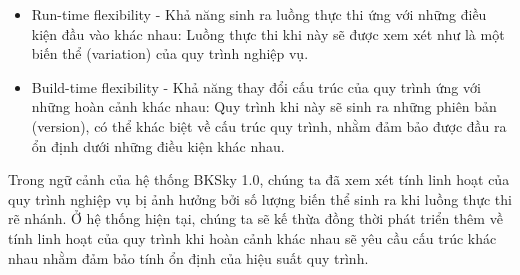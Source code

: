 \begin{itemize}
    \item Run-time flexibility - Khả năng sinh ra luồng thực thi ứng với những điều kiện
          đầu vào khác nhau: Luồng thực thi khi này sẽ được xem xét như là một biến thể
          (variation) của quy trình nghiệp vụ.

    \item Build-time flexibility - Khả năng thay đổi cấu trúc của quy trình ứng với những
          hoàn cảnh khác nhau: Quy trình khi này sẽ sinh ra những phiên bản (version), có
          thể khác biệt về cấu trúc quy trình, nhằm đảm bảo được đầu ra ổn định dưới
          những điều kiện khác nhau.
\end{itemize}

Trong ngữ cảnh của hệ thống BKSky 1.0, chúng ta đã xem xét tính linh hoạt của
quy trình nghiệp vụ bị ảnh hưởng bởi số lượng biến thể sinh ra khi luồng thực
thi rẽ nhánh. Ở hệ thống hiện tại, chúng ta sẽ kế thừa đồng thời phát triển
thêm về tính linh hoạt của quy trình khi hoàn cảnh khác nhau sẽ yêu cầu cấu
trúc khác nhau nhằm đảm bảo tính ổn định của hiệu suất quy trình.